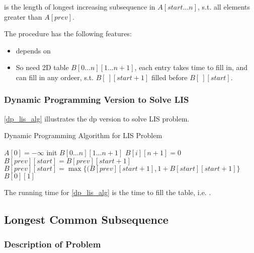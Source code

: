  is the length of longest increasing
subsequence in $A[start\ldots n]$, s.t. all elements greater than
$A[prev]$.

\observation

The procedure  has the following features:

\begin{itemize}
    \item {} depends on 
    \item So need 2D table $B[0\ldots n][1\ldots n+1]$, each entry takes
         time to fill in, and can fill in any ordeer,
        s.t. $B[\ ][start+1]$ filled before $B[\ ][start]$.
\end{itemize}


\subsubsection{Dynamic Programming Version to Solve LIS}
\cref{dp_lis_alg} illustrates the dp version to solve LIS problem.

\begin{algorithm}[H]
\caption{Dynamic Programming Algorithm for LIS Problem}\label{dp_lis_alg}
\begin{algorithmic}[1]
\State $A[0] = -\infty$
\State init $B[0\ldots n][1\ldots n+1]$
    \State $B[i][n+1]=0$
\EndFor
{}
            \State $B[prev][start] = B[prev][start + 1]$
        \Else
        \State $B[prev][start] = \max\{(B[prev][start + 1], 1 + B[start][start + 1]\}$
        \EndIf
    \EndFor
\EndFor
\Return $B[0][1]$
\EndProcedure
\end{algorithmic}
\end{algorithm}

The running time for \cref{dp_lis_alg} is the time to fill the table, i.e. .

\subsection{Longest Common Subsequence}

\subsubsection{Description of Problem}

